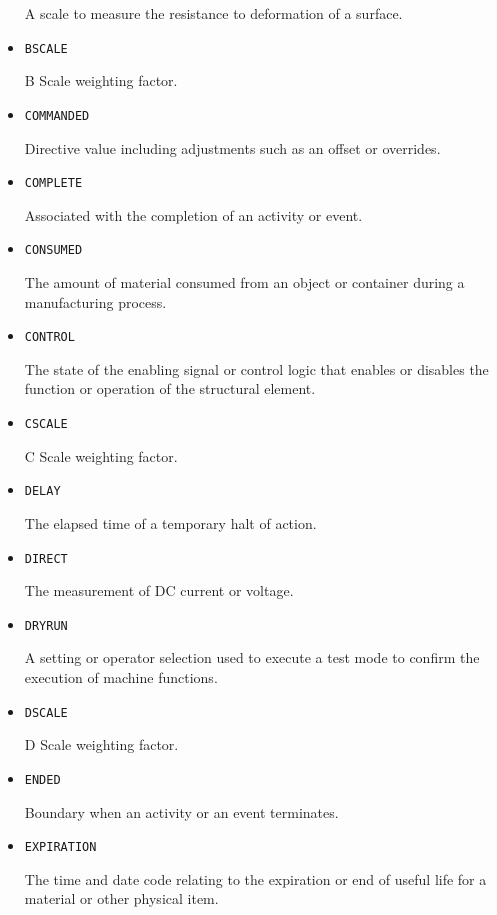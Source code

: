 \begin{itemize}
A scale to measure the resistance to deformation of a surface.


\item \texttt{B\textunderscore SCALE}  

B Scale weighting factor.


\item \texttt{COMMANDED}  

Directive value including adjustments such as an offset or overrides.


\item \texttt{COMPLETE}  

Associated with the completion of an activity or event.


\item \texttt{CONSUMED}  

The amount of material consumed from an object or container during a manufacturing process.


\item \texttt{CONTROL}  

The state of the enabling signal or control logic that enables or disables the function or operation of the structural element.


\item \texttt{C\textunderscore SCALE}  

C Scale weighting factor.


\item \texttt{DELAY}  

The elapsed time of a temporary halt of action.


\item \texttt{DIRECT}  

The measurement of DC current or voltage.


\item \texttt{DRY\textunderscore RUN}  

A setting or operator selection used to execute a test mode to confirm the execution of machine functions.


\item \texttt{D\textunderscore SCALE}  

D Scale weighting factor.


\item \texttt{ENDED}  

Boundary when an activity or an event terminates.


\item \texttt{EXPIRATION}  

The time and date code relating to the expiration or end of useful life for a material or other physical item.



\end{itemize}
